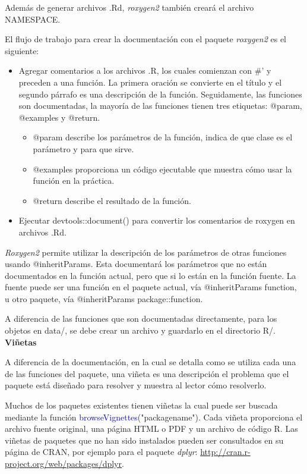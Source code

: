 Además de generar archivos .Rd, \emph{roxygen2} también creará el archivo NAMESPACE.

El flujo de trabajo para crear la documentación con el paquete \emph{roxygen2} es el siguiente:
\begin{itemize}
\item Agregar comentarios a los archivos .R, los cuales comienzan con \#'  y preceden a una función. La primera oración se convierte en el título y el segundo párrafo es una descripción de la función. Seguidamente, las funciones son documentadas, la mayoría de las funciones tienen tres etiquetas: @param, @examples y @return.

\begin{itemize}
\item @param describe los parámetros de la función, indica de que clase es el parámetro y para que sirve.
\item @examples proporciona un código ejecutable que muestra cómo usar la función en la práctica. 
\item @return describe el resultado de la función. 
\end{itemize}
\end{itemize}
\begin{itemize}

\item Ejecutar devtools::document() para convertir los comentarios de roxygen en archivos .Rd. 

\end{itemize}

\emph{Roxygen2} permite utilizar la descripción de los parámetros de otras funciones usando @inheritParams. Esta documentará los parámetros que no están documentados en la función actual, pero que si lo están en la función fuente. La fuente puede ser una función en el paquete actual, vía @inheritParams function, u otro paquete, vía @inheritParams package::function.

A diferencia de las funciones que son documentadas directamente, para los objetos en data/, se debe crear un archivo y guardarlo en el directorio R/.\\

\textbf{Viñetas}

A diferencia de la documentación, en la cual se detalla como se utiliza cada una de las funciones del paquete, una viñeta es una descripción el problema que el paquete está diseñado para resolver y muestra al lector cómo resolverlo.

Muchos de los paquetes existentes tienen viñetas la cual puede ser buscada mediante la función \textcolor{blue}{browseVignettes}("packagename"). Cada viñeta proporciona el archivo fuente original, una página HTML o PDF y un archivo de código R. Las viñetas de paquetes que no han sido instalados pueden ser consultados en su página de CRAN, por ejemplo para el paquete \emph{dplyr}: \url{http://cran.r-project.org/web/packages/dplyr}.

